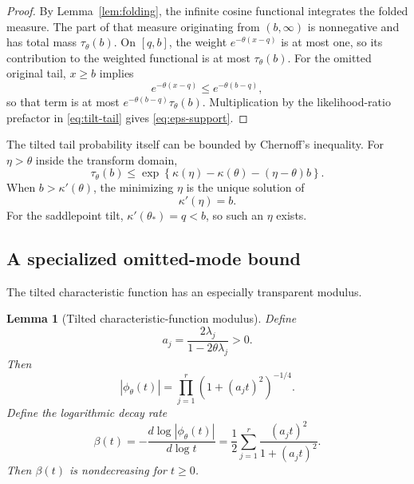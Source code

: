 \documentclass[11pt]{article}
\newtheorem{lemma}[theorem]{Lemma}
\theoremstyle{definition}
\theoremstyle{remark}
\begin{document}
\begin{proof}
By Lemma~\ref{lem:folding}, the infinite cosine functional integrates
the folded measure.  The part of that measure originating from \((b,\infty)\)
is nonnegative and has total mass $\tau_{\theta}(b)$. On $[q,b]$, the weight $e^{-\theta(x-q)}$ is at most one, so its contribution to the weighted functional is at most $\tau_{\theta}(b)$. For the omitted original tail, $x\ge b$ implies
\[
e^{-\theta(x-q)}\le e^{-\theta(b-q)},
\]
so that term is at most $e^{-\theta(b-q)}\tau_{\theta}(b)$. Multiplication by the likelihood-ratio prefactor in \eqref{eq:tilt-tail} gives \eqref{eq:eps-support}.
\end{proof}

The tilted tail probability itself can be bounded by Chernoff's inequality. For $\eta>\theta$ inside the transform domain,
\begin{equation}
\tau_{\theta}(b)
\le
\exp\left\{
\kappa(\eta)-\kappa(\theta)-(\eta-\theta)b
\right\}.
\label{eq:tilted-chernoff}
\end{equation}
When $b>\kappa'(\theta)$, the minimizing $\eta$ is the unique solution of
\begin{equation}
\kappa'(\eta)=b.
\label{eq:eta}
\end{equation}
For the saddlepoint tilt, $\kappa'(\theta_*)=q<b$, so such an $\eta$ exists.

\subsection{A specialized omitted-mode bound}

The tilted characteristic function has an especially transparent modulus.

\begin{lemma}[Tilted characteristic-function modulus]
\label{lem:modulus}
Define
\begin{equation}
a_j=\frac{2\lambda_j}{1-2\theta\lambda_j}>0.
\label{eq:aj}
\end{equation}
Then
\begin{equation}
|\phi_{\theta}(t)|
=\prod_{j=1}^{r}\left(1+(a_jt)^2\right)^{-1/4}.
\label{eq:phi-modulus}
\end{equation}
Define the logarithmic decay rate
\begin{equation}
\beta(t)
=-\frac{d\log|\phi_{\theta}(t)|}{d\log t}
=\frac12\sum_{j=1}^{r}
\frac{(a_jt)^2}{1+(a_jt)^2}.
\label{eq:beta}
\end{equation}
Then $\beta(t)$ is nondecreasing for $t\ge0$.
\end{lemma}
\end{document}
